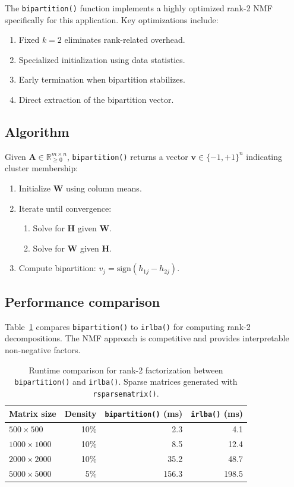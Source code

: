 \documentclass[11pt]{article}
\newcommand{\code}[1]{\texttt{#1}}
\newcommand{\fct}[1]{\code{#1()}}
\begin{document}
The \fct{bipartition} function implements a highly optimized rank-2 NMF 
specifically for this application. Key optimizations include:

\begin{enumerate}
  \item Fixed $k=2$ eliminates rank-related overhead.
  \item Specialized initialization using data statistics.
  \item Early termination when bipartition stabilizes.
  \item Direct extraction of the bipartition vector.
\end{enumerate}

\subsection{Algorithm}

Given $\mathbf{A} \in \mathbb{R}_{\geq 0}^{m \times n}$, \fct{bipartition} 
returns a vector $\mathbf{v} \in \{-1, +1\}^n$ indicating cluster membership:

\begin{enumerate}
  \item Initialize $\mathbf{W}$ using column means.
  \item Iterate until convergence:
    \begin{enumerate}
      \item Solve for $\mathbf{H}$ given $\mathbf{W}$.
      \item Solve for $\mathbf{W}$ given $\mathbf{H}$.
    \end{enumerate}
  \item Compute bipartition: $v_j = \text{sign}(h_{1j} - h_{2j})$.
\end{enumerate}

\subsection{Performance comparison}

Table~\ref{tab:bipartition} compares \fct{bipartition} to \fct{irlba} 
\citep{Baglama2005} for computing rank-2 decompositions. The NMF approach is 
competitive and provides interpretable non-negative factors.

\begin{table}[t]
\centering
\begin{tabular}{lrrr}
\toprule
Matrix size & Density & \fct{bipartition} (ms) & \fct{irlba} (ms) \\
\midrule
$500 \times 500$ & 10\% & 2.3 & 4.1 \\
$1000 \times 1000$ & 10\% & 8.5 & 12.4 \\
$2000 \times 2000$ & 10\% & 35.2 & 48.7 \\
$5000 \times 5000$ & 5\% & 156.3 & 198.5 \\
\bottomrule
\end{tabular}
\caption{\label{tab:bipartition}Runtime comparison for rank-2 factorization 
between \fct{bipartition} and \fct{irlba}. Sparse matrices generated with 
\fct{rsparsematrix}.}
\end{table}
\end{document}
